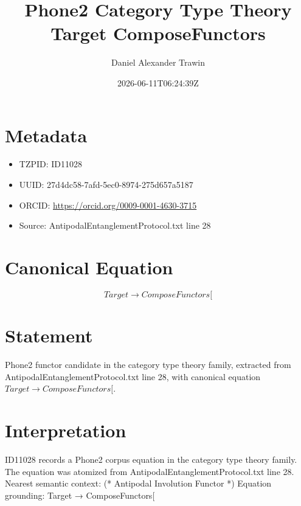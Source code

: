 \documentclass[11pt]{article}
\title{Phone2 Category Type Theory Target ComposeFunctors}
\author{Daniel Alexander Trawin}
\date{2026-06-11T06:24:39Z}
\begin{document}
\maketitle
\section*{Metadata}
\begin{itemize}
\item TZPID: ID11028
\item UUID: 27d4dc58-7afd-5ec0-8974-275d657a5187
\item ORCID: \url{https://orcid.org/0009-0001-4630-3715}
\item Source: AntipodalEntanglementProtocol.txt line 28
\end{itemize}
\section*{Canonical Equation}
\[
Target → ComposeFunctors[
\]
\section*{Statement}
Phone2 functor candidate in the category type theory family, extracted from AntipodalEntanglementProtocol.txt line 28, with canonical equation $Target → ComposeFunctors[$.
\section*{Interpretation}
ID11028 records a Phone2 corpus equation in the category type theory family. The equation was atomized from AntipodalEntanglementProtocol.txt line 28. Nearest semantic context: (* Antipodal Involution Functor *) Equation grounding: Target → ComposeFunctors[
\end{document}
